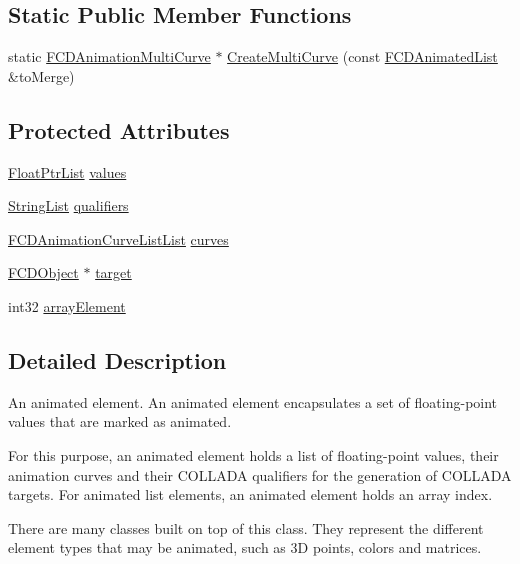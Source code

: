 \subsection*{Static Public Member Functions}
\begin{DoxyCompactItemize}
\item 
static \hyperlink{classFCDAnimationMultiCurve}{FCDAnimationMultiCurve} $\ast$ \hyperlink{classFCDAnimated_ad2ab07c9324f1921f16d741cea22d332}{CreateMultiCurve} (const \hyperlink{classfm_1_1pvector}{FCDAnimatedList} \&toMerge)
\end{DoxyCompactItemize}
\subsection*{Protected Attributes}
\begin{DoxyCompactItemize}
\item 
\hyperlink{classfm_1_1pvector}{FloatPtrList} \hyperlink{classFCDAnimated_afa9e0b280ba2cd7c18e8454eb296e453}{values}
\item 
\hyperlink{classfm_1_1vector}{StringList} \hyperlink{classFCDAnimated_a02ab9175d25055cd2d10d924de312490}{qualifiers}
\item 
\hyperlink{classfm_1_1vector}{FCDAnimationCurveListList} \hyperlink{classFCDAnimated_a602e65dada6111b6b748555550c0cb18}{curves}
\item 
\hyperlink{classFCDObject}{FCDObject} $\ast$ \hyperlink{classFCDAnimated_aca46cbdc7ee7a1b4cf90a5aa6849f4e0}{target}
\item 
int32 \hyperlink{classFCDAnimated_a27daa356d592abe62b5f84871bb6fefc}{arrayElement}
\end{DoxyCompactItemize}


\subsection{Detailed Description}
An animated element. An animated element encapsulates a set of floating-\/point values that are marked as animated.

For this purpose, an animated element holds a list of floating-\/point values, their animation curves and their COLLADA qualifiers for the generation of COLLADA targets. For animated list elements, an animated element holds an array index.

There are many classes built on top of this class. They represent the different element types that may be animated, such as 3D points, colors and matrices. 

